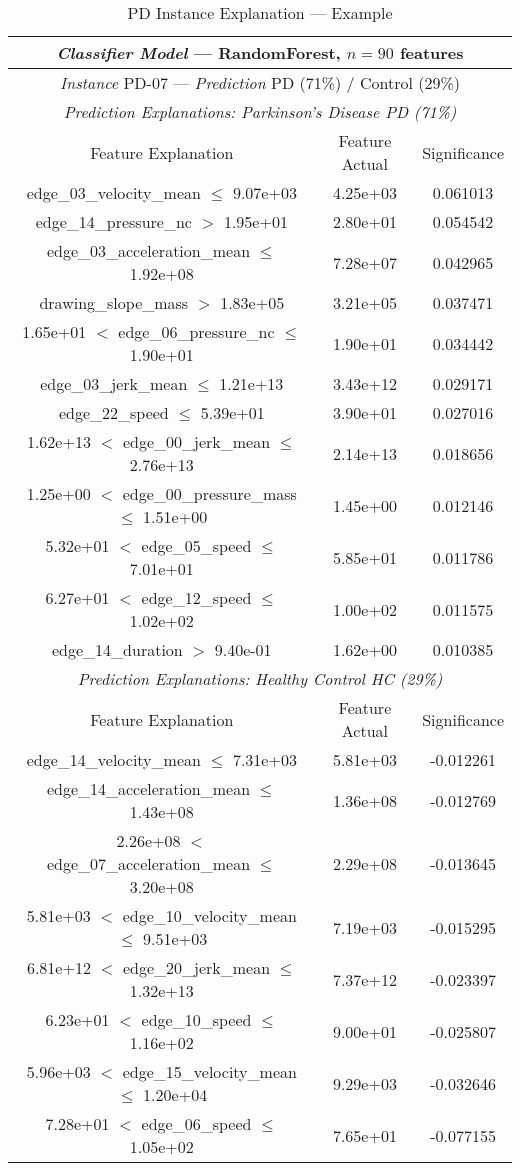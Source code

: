 \begin{table}
\centering
\begin{tabular}{ccc}
\toprule
\multicolumn{3}{c}{\textit{Classifier Model} --- RandomForest, $n=90$ features}\\
\midrule
\multicolumn{3}{c}{\textit{Instance} PD-07 --- \textit{Prediction} PD (71\%) / Control (29\%)}\\
\midrule
\multicolumn{3}{c}{\textit{Prediction Explanations: Parkinson's Disease PD (71\%)}}\\
Feature Explanation & Feature Actual & Significance \\
\toprule
 edge\_03\_velocity\_mean $\leq$ 9.07e+03 &  4.25e+03 &  0.061013 \\
 edge\_14\_pressure\_nc $>$ 1.95e+01 &  2.80e+01 &  0.054542 \\
 edge\_03\_acceleration\_mean $\leq$ 1.92e+08 &  7.28e+07 &  0.042965 \\
 drawing\_slope\_mass $>$ 1.83e+05 &  3.21e+05 &  0.037471 \\
 1.65e+01 $<$ edge\_06\_pressure\_nc $\leq$ 1.90e+01 &  1.90e+01 &  0.034442 \\
 edge\_03\_jerk\_mean $\leq$ 1.21e+13 &  3.43e+12 &  0.029171 \\
 edge\_22\_speed $\leq$ 5.39e+01 &  3.90e+01 &  0.027016 \\
 1.62e+13 $<$ edge\_00\_jerk\_mean $\leq$ 2.76e+13 &  2.14e+13 &  0.018656 \\
 1.25e+00 $<$ edge\_00\_pressure\_mass $\leq$ 1.51e+00 &  1.45e+00 &  0.012146 \\
 5.32e+01 $<$ edge\_05\_speed $\leq$ 7.01e+01 &  5.85e+01 &  0.011786 \\
 6.27e+01 $<$ edge\_12\_speed $\leq$ 1.02e+02 &  1.00e+02 &  0.011575 \\
 edge\_14\_duration $>$ 9.40e-01 &  1.62e+00 &  0.010385 \\
 \midrule
\multicolumn{3}{c}{\textit{Prediction Explanations: Healthy Control HC (29\%)}}\\
Feature Explanation & Feature Actual & Significance \\
\toprule
 edge\_14\_velocity\_mean $\leq$ 7.31e+03 &  5.81e+03 & -0.012261 \\
 edge\_14\_acceleration\_mean $\leq$ 1.43e+08 &  1.36e+08 & -0.012769 \\
 2.26e+08 $<$ edge\_07\_acceleration\_mean $\leq$ 3.20e+08 &  2.29e+08 & -0.013645 \\
 5.81e+03 $<$ edge\_10\_velocity\_mean $\leq$ 9.51e+03 &  7.19e+03 & -0.015295 \\
 6.81e+12 $<$ edge\_20\_jerk\_mean $\leq$ 1.32e+13 &  7.37e+12 & -0.023397 \\
 6.23e+01 $<$ edge\_10\_speed $\leq$ 1.16e+02 &  9.00e+01 & -0.025807 \\
 5.96e+03 $<$ edge\_15\_velocity\_mean $\leq$ 1.20e+04 &  9.29e+03 & -0.032646 \\
 7.28e+01 $<$ edge\_06\_speed $\leq$ 1.05e+02 &  7.65e+01 & -0.077155 \\
\bottomrule
\end{tabular}
\caption{PD Instance Explanation --- Example}
\label{explanation1}
\end{table}

